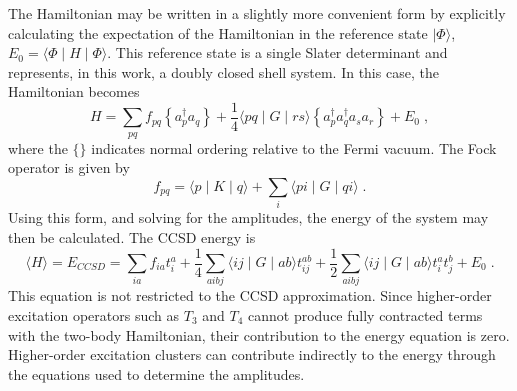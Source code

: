 \documentclass[twoside,12pt]{article}
\begin{document}
The Hamiltonian may be written in a slightly more convenient
form by explicitly calculating the expectation of the Hamiltonian in the
reference state $\mid\Phi\rangle$,
$E_0=\langle\Phi\mid H \mid \Phi\rangle$. This reference state is a single
Slater determinant and represents, in this work, a doubly closed shell system.
In this case, the Hamiltonian becomes
\begin{equation}
H=\sum_{pq}f_{pq}\left\{a^\dagger_p a_q\right\} +
\frac{1}{4}\langle pq \mid G\mid rs \rangle \left\{a^\dagger_p a^\dagger_q
a_s a_r\right\} + E_0 \;,
\end{equation}
where the $\{\}$ indicates normal ordering relative to the Fermi vacuum.
The Fock operator is given by
\begin{equation}
f_{pq}=\langle p\mid K\mid q\rangle + 
\sum_{i}\langle pi \mid G\mid qi \rangle\;.
\end{equation}
Using this form, and solving for the 
amplitudes, the energy of the system may then be calculated. The CCSD
energy is 
\begin{equation}
\langle H \rangle = E_{CCSD}=\sum_{ia}f_{ia}t^a_i 
+\frac{1}{4}\sum_{aibj}\langle ij \mid G\mid ab\rangle t^{ab}_{ij}
+\frac{1}{2}\sum_{aibj}\langle ij \mid G\mid ab\rangle t^a_i t^b_j +E_0\;.
\label{energy_eqn}
\end{equation}
This equation is not restricted to the CCSD approximation. Since 
higher-order excitation operators such as $T_3$ and $T_4$ cannot 
produce fully contracted terms with the two-body Hamiltonian, 
their contribution
to the energy equation is zero. Higher-order excitation clusters can 
contribute indirectly to the energy through the equations used to 
determine the amplitudes. 
\end{document}
